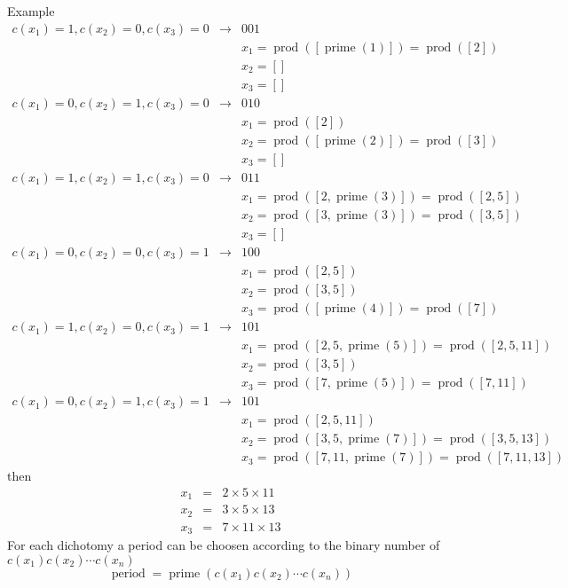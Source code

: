 \documentclass{article}
\newcommand{\tmop}[1]{\ensuremath{\operatorname{#1}}}
\begin{document}
Example
\begin{eqnarray*}
  c ( x_{1} ) =1,c ( x_{2} ) =0,c ( x_{3} ) =0 & \rightarrow & 001\\
  &  & x_{1} = \tmop{prod} ( [ \tmop{prime} ( 1 )   ] ) = \tmop{prod} ( [ 2 ]
  )\\
  &  & x_{2} = [ ]\\
  &  & x_{3} = [ ]\\
  c ( x_{1} ) =0,c ( x_{2} ) =1,c ( x_{3} ) =0 & \rightarrow & 010\\
  &  & x_{1} = \tmop{prod} ( [ 2  ] )\\
  &  & x_{2} = \tmop{prod} ( [ \tmop{prime} ( 2 )   ] ) = \tmop{prod} ( [ 3 ]
  )\\
  &  & x_{3} = [ ]\\
  c ( x_{1} ) =1,c ( x_{2} ) =1,c ( x_{3} ) =0 & \rightarrow & 011\\
  &  & x_{1} = \tmop{prod} ( [ 2, \tmop{prime} ( 3 ) ] ) = \tmop{prod} ( [
  2,5 ] )\\
  &  & x_{2} = \tmop{prod} ( [ 3, \tmop{prime} ( 3 ) ] ) = \tmop{prod} ( [
  3,5 ] )\\
  &  & x_{3} = [ ]\\
  c ( x_{1} ) =0,c ( x_{2} ) =0,c ( x_{3} ) =1 & \rightarrow & 100\\
  &  & x_{1} = \tmop{prod} ( [ 2,5 ] )\\
  &  & x_{2} = \tmop{prod} ( [ 3,5 ] )\\
  &  & x_{3} = \tmop{prod} ( [ \tmop{prime} ( 4 )   ] ) = \tmop{prod} ( [ 7 ]
  )\\
  c ( x_{1} ) =1,c ( x_{2} ) =0,c ( x_{3} ) =1 & \rightarrow & 101\\
  &  & x_{1} = \tmop{prod} ( [ 2,5, \tmop{prime} ( 5 ) ] ) = \tmop{prod} ( [
  2,5,11 ] )\\
  &  & x_{2} = \tmop{prod} ( [ 3,5 ] )\\
  &  & x_{3} = \tmop{prod} ( [ 7, \tmop{prime} ( 5 )   ] ) = \tmop{prod} ( [
  7,11 ] )\\
  c ( x_{1} ) =0,c ( x_{2} ) =1,c ( x_{3} ) =1 & \rightarrow & 101\\
  &  & x_{1} = \tmop{prod} ( [ 2,5,11 ] )\\
  &  & x_{2} = \tmop{prod} ( [ 3,5, \tmop{prime} ( 7 ) ] ) = \tmop{prod} ( [
  3,5,13 ] )\\
  &  & x_{3} = \tmop{prod} ( [ 7,11, \tmop{prime} ( 7 )   ] ) = \tmop{prod} (
  [ 7,11,13 ] )
\end{eqnarray*}
then
\begin{eqnarray*}
  x_{1} & = & 2 \times 5 \times 11\\
  x_{2} & = & 3 \times 5 \times 13\\
  x_{3} & = & 7 \times 11 \times 13
\end{eqnarray*}
For each dichotomy a period can be choosen according to the binary number of
$c ( x_{1} ) c ( x_{2} ) \cdots c ( x_{n} )$
\[ \tmop{period} = \tmop{prime} ( c ( x_{1} ) c ( x_{2} ) \cdots c ( x_{n} ) )
\]
\end{document}

